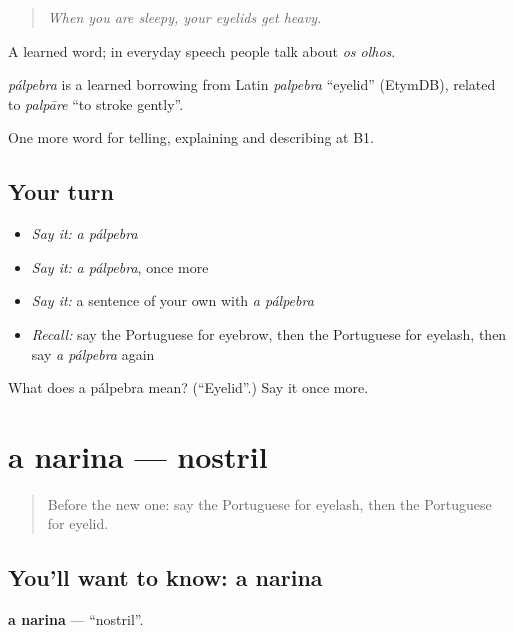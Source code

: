 \begin{quote}
\emph{When you are sleepy, your eyelids get heavy.}
\end{quote}

A learned word; in everyday speech people talk about \emph{os olhos}.

\begin{cousinweb}
\emph{pálpebra} is a learned borrowing from Latin \emph{palpebra} \textquotedblleft{}eyelid\textquotedblright{} (EtymDB), related to \emph{palpāre} \textquotedblleft{}to stroke gently\textquotedblright{}.
\end{cousinweb}

\begin{grammarlens}[title={What you've built}]
One more word for telling, explaining and describing at B1.
\end{grammarlens}

\subsection*{Your turn}
\begin{itemize}
\raggedright
  \item \emph{Say it:} \emph{a pálpebra}
  \item \emph{Say it:} \emph{a pálpebra}, once more
  \item \emph{Say it:} a sentence of your own with \emph{a pálpebra}
  \item \emph{Recall:} say the Portuguese for eyebrow, then the Portuguese for eyelash, then say \emph{a pálpebra} again
\end{itemize}

\begin{tcolorbox}[breakable,colback=teal!4,colframe=teal!35!black,title={Before you move on}]
What does a pálpebra mean? (\textquotedblleft{}Eyelid\textquotedblright{}.) Say it once more.
\end{tcolorbox}
\section[a narina]{a narina — nostril}

\label{lesson:PT-C481-narina}



\begin{quote}
Before the new one: say the Portuguese for eyelash, then the Portuguese for eyelid.
\end{quote}

\subsection*{You'll want to know: a narina}
\textbf{a narina} — \textquotedblleft{}nostril\textquotedblright{}.


